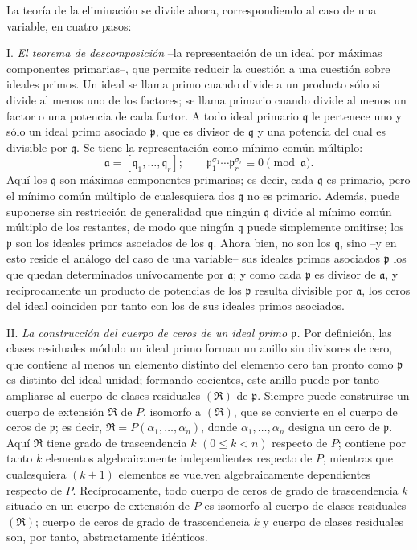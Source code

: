 \documentclass[11pt]{article}
\begin{document}
La teoría de la eliminación se divide ahora, correspondiendo al caso de una variable, en cuatro pasos:

I. \emph{El teorema de descomposición} --la representación de un ideal por máximas componentes primarias--, que permite reducir la cuestión a una cuestión sobre ideales primos. Un ideal se llama primo cuando divide a un producto sólo si divide al menos uno de los factores; se llama primario cuando divide al menos un factor o una potencia de cada factor. A todo ideal primario $\mathfrak q$ le pertenece uno y sólo un ideal primo asociado $\mathfrak p$, que es divisor de $\mathfrak q$ y una potencia del cual es divisible por $\mathfrak q$. Se tiene la representación como mínimo común múltiplo:
\[
 \mathfrak a=[\mathfrak q_1,\ldots,\mathfrak q_r];\qquad
 \mathfrak p_1^{\sigma_1}\cdots \mathfrak p_r^{\sigma_r}\equiv 0\pmod{\mathfrak a}.
\]
Aquí los $\mathfrak q$ son máximas componentes primarias; es decir, cada $\mathfrak q$ es primario, pero el mínimo común múltiplo de cualesquiera dos $\mathfrak q$ no es primario. Además, puede suponerse sin restricción de generalidad que ningún $\mathfrak q$ divide al mínimo común múltiplo de los restantes, de modo que ningún $\mathfrak q$ puede simplemente omitirse; los $\mathfrak p$ son los ideales primos asociados de los $\mathfrak q$. Ahora bien, no son los $\mathfrak q$, sino --y en esto reside el análogo del caso de una variable-- sus ideales primos asociados $\mathfrak p$ los que quedan determinados unívocamente por $\mathfrak a$; y como cada $\mathfrak p$ es divisor de $\mathfrak a$, y recíprocamente un producto de potencias de los $\mathfrak p$ resulta divisible por $\mathfrak a$, los ceros del ideal coinciden por tanto con los de sus ideales primos asociados.

II. \emph{La construcción del cuerpo de ceros de un ideal primo $\mathfrak p$.} Por definición, las clases residuales módulo un ideal primo forman un anillo sin divisores de cero, que contiene al menos un elemento distinto del elemento cero tan pronto como $\mathfrak p$ es distinto del ideal unidad; formando cocientes, este anillo puede por tanto ampliarse al cuerpo de clases residuales $(\mathfrak R)$ de $\mathfrak p$. Siempre puede construirse un cuerpo de extensión $\mathfrak R$ de $P$, isomorfo a $(\mathfrak R)$, que se convierte en el cuerpo de ceros de $\mathfrak p$; es decir, $\mathfrak R=P(\alpha_1,\ldots,\alpha_n)$, donde $\alpha_1,\ldots,\alpha_n$ designa un cero de $\mathfrak p$. Aquí $\mathfrak R$ tiene grado de trascendencia $k$ $(0\leq k<n)$ respecto de $P$; contiene por tanto $k$ elementos algebraicamente independientes respecto de $P$, mientras que cualesquiera $(k+1)$ elementos se vuelven algebraicamente dependientes respecto de $P$. Recíprocamente, todo cuerpo de ceros de grado de trascendencia $k$ situado en un cuerpo de extensión de $P$ es isomorfo al cuerpo de clases residuales $(\mathfrak R)$; cuerpo de ceros de grado de trascendencia $k$ y cuerpo de clases residuales son, por tanto, abstractamente idénticos.
\end{document}
